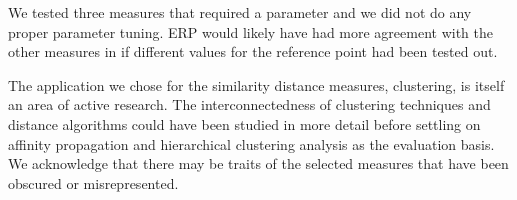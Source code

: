 We tested three measures that required a parameter and we did not do any proper parameter tuning. 
ERP would likely have had more agreement with the other measures in  if different values for the reference point had been tested out. 




The application we chose for the similarity distance measures, clustering, is itself an area of active research. 
The interconnectedness of clustering techniques and distance algorithms could have been studied in more detail before settling on affinity propagation and hierarchical clustering analysis as the evaluation basis.
We acknowledge that there may be traits of the selected measures that have been obscured or misrepresented. 

